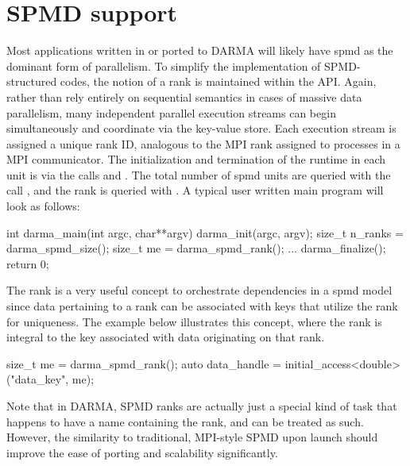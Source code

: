 \section{SPMD support}
\label{sec:spmd}
Most applications written in or ported to DARMA will likely have \gls{spmd} as
the dominant form of parallelism.
To simplify the implementation of SPMD-structured codes, the notion of 
a \gls{rank} is maintained within the \gls{API}.   
Again, rather than rely entirely on sequential semantics in cases of massive data parallelism,
many independent parallel execution streams can begin simultaneously and coordinate via the key-value store.
Each execution stream is assigned a unique rank ID, analogous to the MPI rank assigned to processes in a MPI communicator.
The initialization and termination of the runtime in each unit 
is via the calls  and . 
The total number of \gls{spmd} units are queried with the call ,
and the rank is queried with . A typical user 
written main program will look as follows:
\begin{CppCode}
int darma_main(int argc, char**argv){
  darma_init(argc, argv);
  size_t n_ranks = darma_spmd_size();
  size_t me = darma_spmd_rank();
  ...
  darma_finalize();
  return 0;
}
\end{CppCode}

The rank is a very useful concept to orchestrate dependencies in a \gls{spmd}
model since data pertaining to a rank can be associated with keys that utilize
the rank for uniqueness. The example below illustrates this concept, where
the rank is integral to the key associated with data originating on that rank.
\begin{CppCode}
size_t me = darma_spmd_rank();
auto data_handle = initial_access<double>("data_key", me);
\end{CppCode}  
Note that in DARMA, SPMD ranks are actually just a special kind of task that
happens to have a name containing the rank, and can be treated as such. 
However, the similarity to traditional, MPI-style SPMD upon launch should improve the ease of porting and scalability significantly.


